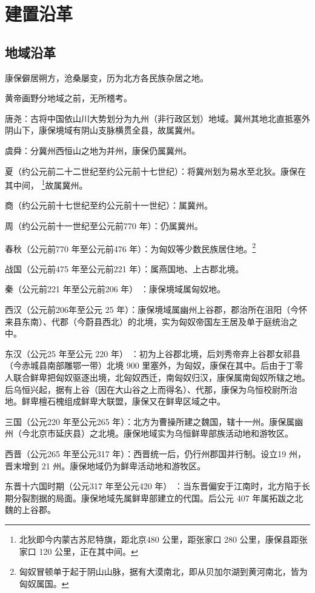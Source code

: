 \chapter{建置沿革}
\section{地域沿革}
康保僻居朔方，沧桑屡变，历为北方各民族杂居之地。

黄帝画野分地域之前，无所稽考。

唐尧：古将中国依山川大势划分为九州（非行政区划）地域。冀州其地北直抵塞外阴山下，康保境域有阴山支脉横贯全县，故属冀州。

虞舜：分冀州西恒山之地为并州，康保仍属冀州。

夏（约公元前二十二世纪至约公元前十七世纪）：将冀州划为易水至北狄。康保在其中间， \footnote{北狄即今内蒙古苏尼特旗，距北京480 公里，距张家口 280 公里，康保县距张家口 120 公里，正在其中间。}故属冀州。

商（约公元前十七世纪至约公元前十一世纪）：属冀州。

周（约公元前十一世纪至公元前770 年）：仍属冀州。

春秋（公元前770 年至公元前476 年）：为匈奴等少数民族居住地。\footnote{匈奴冒顿单于起于阴山山脉，据有大漠南北，即从贝加尔湖到黄河南北，皆为匈奴属国。}

战国（公元前475 年至公元前221 年）：属燕国地、上古郡北境。

秦（公元前221 年至公元前206 年） ：康保境域属匈奴地。

西汉（公元前206年至公元 25 年）：康保境域属幽州上谷郡，郡治所在沮阳（今怀来县东南）、代郡（今蔚县西北）的北境，实为匈奴帝国左王居及单于庭统治之中。

东汉（公元25 年至公元 220 年） ：初为上谷郡北境，后刘秀帝弃上谷郡女祁县（今赤城县南部雕鄂一带）北境 900 里塞外，为匈奴，康保在其中。后由于丁零人联合鲜卑把匈奴驱逐出境，北匈奴西迁，南匈奴归汉，康保属南匈奴所辖之地。后乌恒兴起，据有上谷（因在大山谷之上而得名）、代那，康保为乌恒校尉所治地。鲜卑檀石槐组成鲜卑大联盟，康保又在鲜卑区域之中。

三国（公元220 年至公元265 年）：北方为曹操所建之魏国，辖十一州。康保属幽州（今北京市延庆县）之北境。康保地域实为乌恒鲜卑部族活动地和游牧区。

西晋（公元265 年至公元317 年）：西晋统一后，仍行州郡国并行制。设立19 州，晋末增到 21 州。康保地域仍为鲜卑活动地和游牧区。

东晋十六国时期（公元317 年至公元420 年） ：当东晋偏安于江南时，北方陷于长期分裂割据的局面。康保地域先属鲜卑部建立的代国。后公元 407 年属拓跋之北魏的上谷郡。

